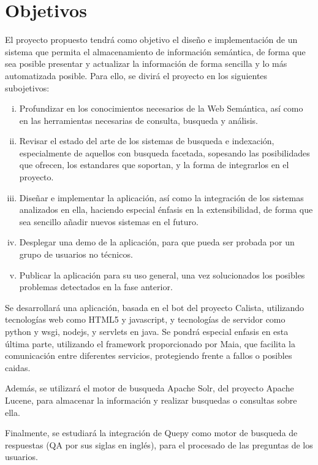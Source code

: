 \documentclass[a4paper,11pt]{report}
\begin{document}
\chapter*{Objetivos}

El proyecto propuesto tendrá como objetivo el diseño e implementación de un sistema que permita el almacenamiento de información semántica, de forma que sea posible presentar y actualizar la información de forma sencilla y lo más automatizada posible.
Para ello, se divirá el proyecto en los siguientes subojetivos:

\begin{enumerate}[i.]
  \item Profundizar en los conocimientos necesarios de la Web Semántica, así como en las herramientas necesarias de consulta, busqueda y análisis.
  \item Revisar el estado del arte de los sistemas de busqueda e indexación, especialmente de aquellos con busqueda facetada, sopesando las posibilidades que ofrecen, los estandares que soportan, y la forma de integrarlos en el proyecto.
  \item Diseñar e implementar la aplicación, así como la integración de los sistemas analizados en ella, haciendo especial énfasis en la extensibilidad, de forma que sea sencillo añadir nuevos sistemas en el futuro.
  \item Desplegar una demo de la aplicación, para que pueda ser probada por un grupo de usuarios no técnicos.
  \item Publicar la aplicación para su uso general, una vez solucionados los posibles problemas detectados en la fase anterior.

\end{enumerate}


Se desarrollará una aplicación, basada en el bot del proyecto Calista, utilizando tecnologías web como HTML5 y javascript, y tecnologías de servidor como python y wsgi, nodejs, y servlets en java. Se pondrá especial enfasis en esta última parte, utilizando el framework proporcionado por Maia, que facilita la comunicación entre diferentes servicios, protegiendo frente a fallos o posibles caidas.

Además, se utilizará el motor de busqueda Apache Solr, del proyecto Apache Lucene, para almacenar la información y realizar busquedas o consultas sobre ella.

Finalmente, se estudiará la integración de Quepy como motor de busqueda de respuestas (QA por sus siglas en inglés), para el procesado de las preguntas de los usuarios.
\end{document}
